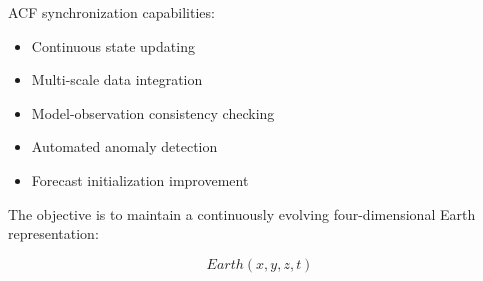 ACF synchronization capabilities:


\begin{itemize}

\item Continuous state updating

\item Multi-scale data integration

\item Model-observation consistency checking

\item Automated anomaly detection

\item Forecast initialization improvement

\end{itemize}



The objective is to maintain a continuously evolving
four-dimensional Earth representation:


\[
Earth(x,y,z,t)
\]
